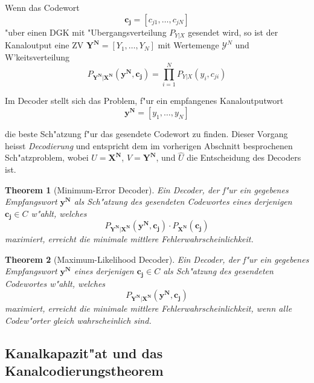 \documentclass[german, 10pt, a4paper, twocolumn]{scrartcl}
\newtheorem{theorem}{Theorem}
\begin{document}
Wenn das Codewort
\begin{displaymath}
	\mathbf{c_j} = [c_{j1},\ldots,c_{jN}]
\end{displaymath}
"uber einen DGK mit "Ubergangsverteilung $P_{Y|X}$ gesendet wird, so ist der Kanaloutput eine ZV $\mathbf{Y^N} = [Y_1,\ldots,Y_N]$ mit Wertemenge $\mathcal{Y}^N$ und W'keitsverteilung
\begin{displaymath}
	P_{\mathbf{Y^N}|\mathbf{X^N}}(\mathbf{y^N},\mathbf{c_j}) = \prod^N_{i=1} P_{Y|X}(y_i, c_{ji})
\end{displaymath}

Im Decoder stellt sich das Problem, f"ur ein empfangenes Kanaloutputwort
\begin{displaymath}
	\mathbf{y^N} = [y_1,\ldots, y_N]
\end{displaymath}

die beste Sch"atzung f"ur das gesendete Codewort zu finden. Dieser Vorgang heisst \textit{Decodierung} und entspricht dem im vorherigen Abschnitt besprochenen Sch"atzproblem, wobei $U=\mathbf{X^N}$, $V=\mathbf{Y^N}$, und $\hat{U}$ die Entscheidung des Decoders ist.

\begin{theorem}[Minimum-Error Decoder]
	Ein Decoder, der f"ur ein gegebenes Empfangswort $\mathbf{y^N}$ als Sch"atzung des gesendeten Codewortes eines derjenigen $\mathbf{c_j}\in C$ w"ahlt, welches
	\begin{displaymath}
		P_{\mathbf{Y^N}|\mathbf{X^N}}(\mathbf{y^N},\mathbf{c_j})\cdotp P_{\mathbf{X^N}}(\mathbf{c_j})
	\end{displaymath}
	maximiert, erreicht die minimale mittlere Fehlerwahrscheinlichkeit.
\end{theorem}

\begin{theorem}[Maximum-Likelihood Decoder]
	Ein Decoder, der f"ur ein gegebenes Empfangswort $\mathbf{y^N}$ eines derjenigen $\mathbf{c_j}\in C$ als Sch"atzung des gesendeten Codewortes w"ahlt, welches
	\begin{displaymath}
		P_{\mathbf{Y^N}|\mathbf{X^N}}(\mathbf{y^N}, \mathbf{c_j})
	\end{displaymath}
	maximiert, erreicht die minimale mittlere Fehlerwahrscheinlichkeit, wenn alle Codew"orter gleich wahrscheinlich sind.
\end{theorem}

\subsection{Kanalkapazit"at und das Kanalcodierungstheorem}
\end{document}
